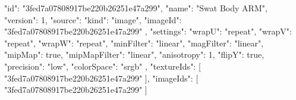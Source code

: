 {
  "id": "3fed7a07808917be220b26251e47a299",
  "name": "Swat Body ARM",
  "version": 1,
  "source": {
    "kind": "image",
    "imageId": "3fed7a07808917be220b26251e47a299"
  },
  "settings": {
    "wrapU": "repeat",
    "wrapV": "repeat",
    "wrapW": "repeat",
    "minFilter": "linear",
    "magFilter": "linear",
    "mipMap": true,
    "mipMapFilter": "linear",
    "anisotropy": 1,
    "flipY": true,
    "precision": "low",
    "colorSpace": "srgb"
  },
  "textureIds": [
    "3fed7a07808917be220b26251e47a299"
  ],
  "imageIds": [
    "3fed7a07808917be220b26251e47a299"
  ]
}
